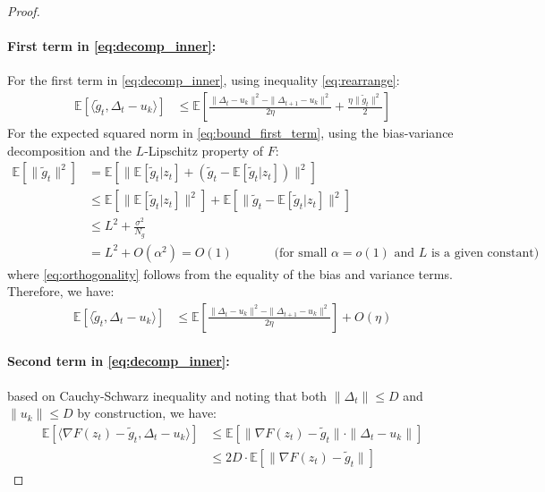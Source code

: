 \documentclass[letterpaper]{article} %
\newcommand{\1}{\mathbf{1}}
\begin{document}
\begin{proof}
\paragraph{First term in \cref{eq:decomp_inner}:} For the first term in \eqref{eq:decomp_inner}, using inequality \eqref{eq:rearrange}:
\begin{align}
\mathbb{E}[\langle \tilde{g}_t, \Delta_t - u_k \rangle] &\leq \mathbb{E}\left[\frac{\|\Delta_t - u_k\|^2 - \|\Delta_{t+1} - u_k\|^2}{2\eta} + \frac{\eta\|\tilde{g}_t\|^2}{2}\right] \label{eq:bound_first_term}
\end{align}
For the expected squared norm in \eqref{eq:bound_first_term}, using the bias-variance decomposition and the $L$-Lipschitz property of $F$:
\begin{align}
\mathbb{E}[\|\tilde{g}_t\|^2] &= \mathbb{E}[\|\mathbb{E}[\tilde{g}_t|z_t] + (\tilde{g}_t - \mathbb{E}[\tilde{g}_t|z_t])\|^2] \label{eq:expand_square}\\
&\leq \mathbb{E}[\|\mathbb{E}[\tilde{g}_t|z_t]\|^2] + \mathbb{E}[\|\tilde{g}_t - \mathbb{E}[\tilde{g}_t|z_t]\|^2] \label{eq:orthogonality}\\
&\leq L^2 + \frac{\sigma^2}{N_g} \label{eq:lipschitz_bound}\\
&= L^2 + O(\alpha^2) = O(1) \quad \quad \quad \text{ (for small } \alpha = o(1) \text{ and $L$ is a given constant)} \label{eq:norm_final}
\end{align}
where \eqref{eq:orthogonality} follows from the equality of the bias and variance terms.
Therefore, we have:
\begin{align}
\mathbb{E}[\langle \tilde{g}_t, \Delta_t - u_k \rangle] &\leq \mathbb{E}\left[\frac{\|\Delta_t - u_k\|^2 - \|\Delta_{t+1} - u_k\|^2}{2\eta} \right] + O(\eta) \label{eq:final_first_term}
\end{align}


\paragraph{Second term in \cref{eq:decomp_inner}:} based on Cauchy-Schwarz inequality and noting that both $\|\Delta_t\|\leq D$ and $\|u_k\|\leq D$ by construction, we have:
\begin{align}
\mathbb{E}[\langle \nabla F(z_t) - \tilde{g}_t, \Delta_t - u_k \rangle] &\leq \mathbb{E}[\|\nabla F(z_t) - \tilde{g}_t\| \cdot \|\Delta_t - u_k\|] \label{eq:cs_ineq}\\
&\leq 2D \cdot \mathbb{E}[\|\nabla F(z_t) - \tilde{g}_t\|] \label{eq:bound_second_term}
\end{align}


\end{proof}
\end{document}
